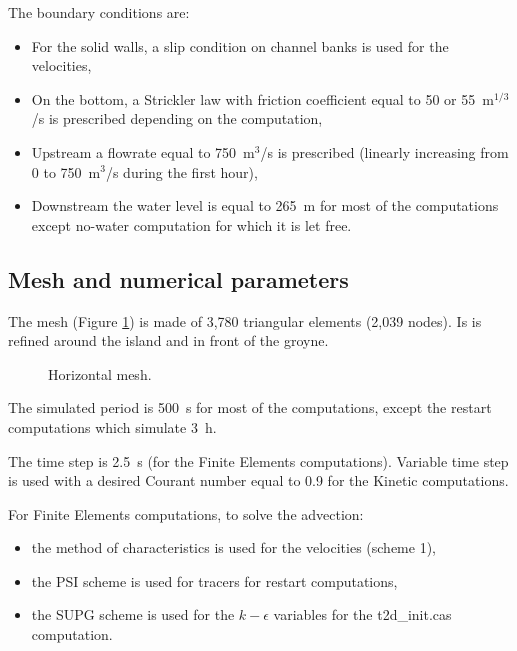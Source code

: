 The boundary conditions are:
\begin{itemize}
\item For the solid walls, a slip condition on channel banks is used for the
velocities,
\item On the bottom, a Strickler law with friction coefficient equal to
50 or 55~m$^{1/3}$/s is prescribed depending on the computation,
\item Upstream a flowrate equal to 750~m$^3$/s is prescribed
(linearly increasing from 0 to 750~m$^3$/s during the first hour),
\item Downstream the water level is equal to 265~m for most of the computations except
  no-water computation for which it is let free.
\end{itemize}

\subsection{Mesh and numerical parameters}

The mesh (Figure \ref{t2d:init:fig:meshH})
is made of 3,780 triangular elements (2,039 nodes).
Is is refined around the island and in front of the groyne.

\begin{figure}[!htbp]
 \centering
 \caption{Horizontal mesh.}
 \label{t2d:init:fig:meshH}
\end{figure}

The simulated period is 500~s for most of the computations, except the restart computations
which simulate 3~h.

The time step is 2.5~s (for the Finite Elements computations).
Variable time step is used with a desired Courant number equal to 0.9
for the Kinetic computations.

For Finite Elements computations, to solve the advection:
\begin{itemize}
\item the method of characteristics is used for the velocities (scheme 1),
\item the PSI scheme is used for tracers for restart computations,
\item the SUPG scheme is used for the $k-\epsilon$ variables
for the t2d\_init.cas computation. 
\end{itemize}


